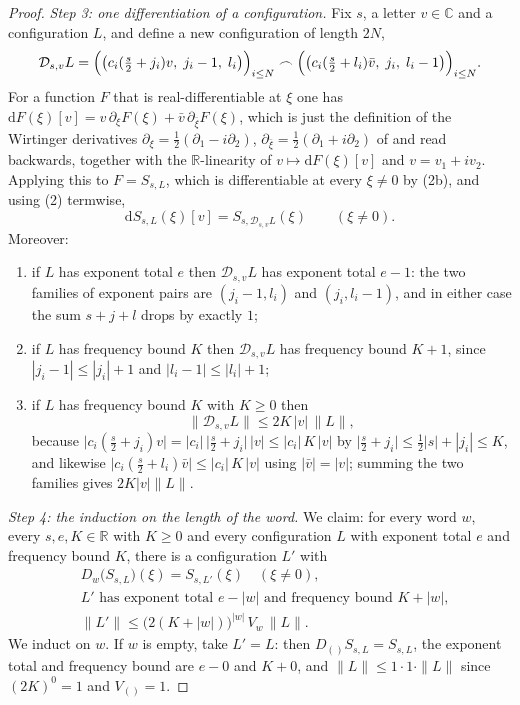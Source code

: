 \begin{proof}
\emph{Step 3: one differentiation of a configuration.}  Fix $s$, a letter
$v\in\mathbb{C}$ and a configuration $L$, and define a new configuration of
length $2N$,
\[
  \mathcal{D}_{s,v}L
  =\Bigl(\bigl(c_i(\tfrac{s}{2}+j_i)v,\;j_i-1,\;l_i\bigr)\Bigr)_{i\le N}
   \frown
   \Bigl(\bigl(c_i(\tfrac{s}{2}+l_i)\bar v,\;j_i,\;l_i-1\bigr)\Bigr)_{i\le N}.
\]
For a function $F$ that is real-differentiable at $\xi$ one has
$\mathrm{d}F(\xi)[v]=v\,\partial_\xi F(\xi)+\bar v\,\partial_{\bar\xi}F(\xi)$,
which is just the definition of the Wirtinger derivatives
$\partial_\xi=\tfrac12(\partial_1-i\partial_2)$,
$\partial_{\bar\xi}=\tfrac12(\partial_1+i\partial_2)$ of  and
 read backwards, together with the $\mathbb{R}$-linearity of
$v\mapsto\mathrm{d}F(\xi)[v]$ and $v=v_1+iv_2$.  Applying this to
$F=S_{s,L}$, which is differentiable at every $\xi\ne0$ by (2b), and using
(2) termwise,
\begin{equation}\tag{4}
  \mathrm{d}S_{s,L}(\xi)[v]=S_{s,\mathcal{D}_{s,v}L}(\xi)\qquad(\xi\ne0).
\end{equation}
Moreover:
\begin{enumerate}
\item[(i)] if $L$ has exponent total $e$ then $\mathcal{D}_{s,v}L$ has
  exponent total $e-1$: the two families of exponent pairs are
  $(j_i-1,l_i)$ and $(j_i,l_i-1)$, and in either case the sum
  $s+j+l$ drops by exactly $1$;
\item[(ii)] if $L$ has frequency bound $K$ then $\mathcal{D}_{s,v}L$ has
  frequency bound $K+1$, since $|j_i-1|\le|j_i|+1$ and $|l_i-1|\le|l_i|+1$;
\item[(iii)] if $L$ has frequency bound $K$ with $K\ge0$ then
  \begin{equation}\tag{5}
    \bigl\|\mathcal{D}_{s,v}L\bigr\|\le 2K\,|v|\,\|L\| ,
  \end{equation}
  because $\bigl|c_i(\tfrac{s}{2}+j_i)v\bigr|=|c_i|\,
  \bigl|\tfrac{s}{2}+j_i\bigr|\,|v|\le|c_i|\,K\,|v|$ by
  $\bigl|\tfrac{s}{2}+j_i\bigr|\le\tfrac12|s|+|j_i|\le K$, and likewise
  $\bigl|c_i(\tfrac{s}{2}+l_i)\bar v\bigr|\le|c_i|\,K\,|v|$ using
  $|\bar v|=|v|$; summing the two families gives $2K|v|\|L\|$.
\end{enumerate}

\emph{Step 4: the induction on the length of the word.}  We claim: for every
word $w$, every $s,e,K\in\mathbb{R}$ with $K\ge0$ and every configuration $L$
with exponent total $e$ and frequency bound $K$, there is a configuration $L'$
with
\begin{equation}\tag{6}
  \begin{aligned}
  &D_w\bigl(S_{s,L}\bigr)(\xi)=S_{s,L'}(\xi)\quad(\xi\ne0),\\
  &L'\text{ has exponent total }e-|w|\text{ and frequency bound }K+|w|,\\
  &\|L'\|\le\bigl(2(K+|w|)\bigr)^{|w|}\,V_w\,\|L\| .
  \end{aligned}
\end{equation}
We induct on $w$.  If $w$ is empty, take $L'=L$: then $D_{()}S_{s,L}=S_{s,L}$,
the exponent total and frequency bound are $e-0$ and $K+0$, and
$\|L\|\le1\cdot1\cdot\|L\|$ since $(2K)^{0}=1$ and $V_{()}=1$.


\end{proof}
